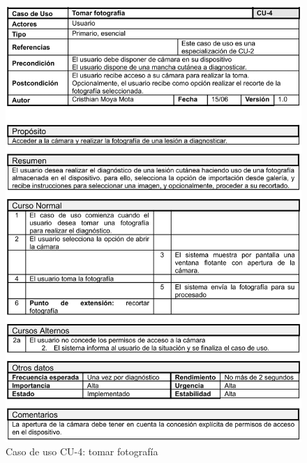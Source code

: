   \begin{figure}[H]
	\centering
	\includegraphics[scale=0.85]{imagenes/cu-4.png}
	\caption{Caso de uso CU-4: tomar fotografía}
	\label{fig:cu4}
\end{figure}

